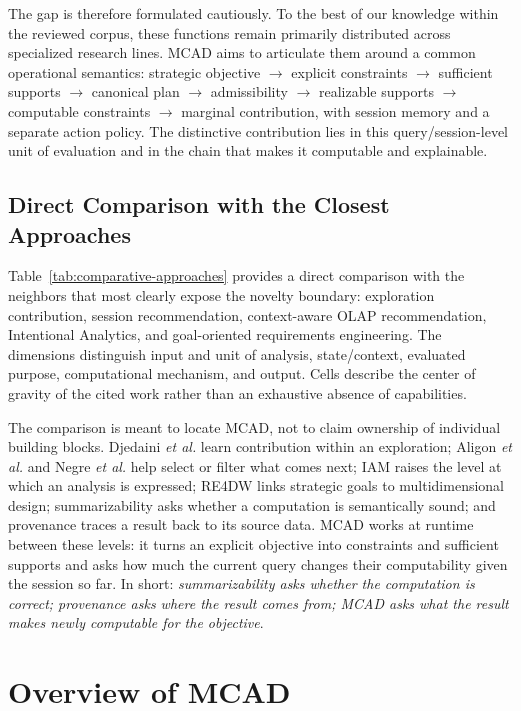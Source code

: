 \documentclass[journal]{IEEEtran}
\begin{document}
The gap is therefore formulated cautiously. To the best of our knowledge within the reviewed corpus, these functions remain primarily distributed across specialized research lines. MCAD aims to articulate them around a common operational semantics: strategic objective $\rightarrow$ explicit constraints $\rightarrow$ sufficient supports $\rightarrow$ canonical plan $\rightarrow$ admissibility $\rightarrow$ realizable supports $\rightarrow$ computable constraints $\rightarrow$ marginal contribution, with session memory and a separate action policy. The distinctive contribution lies in this query/session-level unit of evaluation and in the chain that makes it computable and explainable.

\subsection{Direct Comparison with the Closest Approaches}

Table~\ref{tab:comparative-approaches} provides a direct comparison with the neighbors that most clearly expose the novelty boundary: exploration contribution, session recommendation, context-aware OLAP recommendation, Intentional Analytics, and goal-oriented requirements engineering. The dimensions distinguish input and unit of analysis, state/context, evaluated purpose, computational mechanism, and output. Cells describe the center of gravity of the cited work rather than an exhaustive absence of capabilities.



The comparison is meant to locate MCAD, not to claim ownership of individual building blocks. Djedaini \emph{et al.} learn contribution within an exploration; Aligon \emph{et al.} and Negre \emph{et al.} help select or filter what comes next; IAM raises the level at which an analysis is expressed; RE4DW links strategic goals to multidimensional design; summarizability asks whether a computation is semantically sound; and provenance traces a result back to its source data. MCAD works at runtime between these levels: it turns an explicit objective into constraints and sufficient supports and asks how much the current query changes their computability given the session so far. In short: \emph{summarizability asks whether the computation is correct; provenance asks where the result comes from; MCAD asks what the result makes newly computable for the objective}.

\section{Overview of MCAD}
\label{sec:overview}
\end{document}
